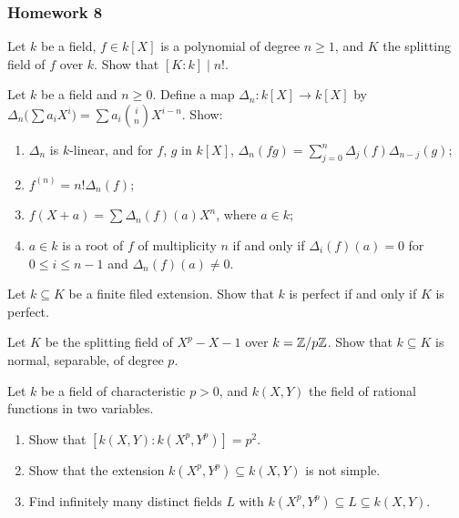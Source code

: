 \subsubsection{Homework 8}
\setcounter{exercise}{0}

\begin{problem}
  Let $k$ be a field, $f\in k[X]$ is a polynomial of degree $n\geq 1$,
  and $K$ the splitting field of $f$ over $k$. Show that
  $[K:k]\mid n!$.
\end{problem}
\begin{solution}
\end{solution}

\begin{problem}
  Let $k$ be a field and $n\geq 0$. Define a map
  $\Delta_n\colon k[X]\to k[X]$ by
  $\Delta_n\bigl(\sum a_iX^i\bigr)=\sum
  a_i\binom{i}{n}X^{i-n}$. Show:
\begin{enumerate}[label=(\alph*),noitemsep]
\item $\Delta_n$ is $k$-linear, and for $f$, $g$ in $k[X]$,
  $\Delta_n(fg)=\sum_{j=0}^n\Delta_j(f)\Delta_{n-j}(g)$;
\item $f^{(n)}=n!\Delta_n(f)$;
\item $f(X+a)=\sum\Delta_n(f)(a)X^n$, where $a\in k$;
\item $a\in k$ is a root of $f$ of multiplicity $n$ if and only if
  $\Delta_i(f)(a)=0$ for $0\leq i\leq n-1$ and $\Delta_n(f)(a)\neq 0$.
\end{enumerate}
\end{problem}
\begin{solution}
\end{solution}

\begin{problem}
  Let $k\subseteq K$ be a finite filed extension. Show that $k$ is
  perfect if and only if $K$ is perfect.
\end{problem}
\begin{solution}
\end{solution}

\begin{problem}
  Let $K$ be the splitting field of $X^p-X-1$ over
  $k=\mathbb{Z}/p\mathbb{Z}$. Show that $k\subseteq K$ is normal,
  separable, of degree $p$.
\end{problem}
\begin{solution}
\end{solution}

\begin{problem}
  Let $k$ be a field of characteristic $p>0$, and $k(X,Y)$ the field
  of rational functions in two variables.
\begin{enumerate}[label=(\alph*),noitemsep]
\item Show that $\left[k(X,Y):k(X^p,Y^p)\right]=p^2$.
\item Show that the extension $k(X^p,Y^p)\subseteq k(X,Y)$ is not
  simple.
\item Find infinitely many distinct fields $L$ with
  $k(X^p,Y^p)\subseteq L\subseteq k(X,Y)$.
\end{enumerate}
\end{problem}
\begin{solution}
\end{solution}

